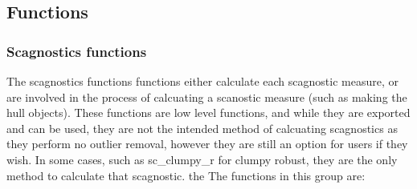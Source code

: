 \hypertarget{functions}{%
\subsection{Functions}\label{functions}}

\hypertarget{scagnostics-functions}{%
\subsubsection{Scagnostics functions}\label{scagnostics-functions}}

The scagnostics functions functions either calculate each scagnostic
measure, or are involved in the process of calcuating a scanostic
measure (such as making the hull objects). These functions are low level
functions, and while they are exported and can be used, they are not the
intended method of calcuating scagnostics as they perform no outlier
removal, however they are still an option for users if they wish. In
some cases, such as sc\_clumpy\_r for clumpy robust, they are the only
method to calculate that scagnostic. the The functions in this group
are:

